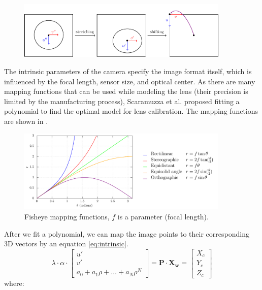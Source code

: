 \begin{figure}[H]
	\centering
	\includegraphics[width=0.9\textwidth]{./fig/tikz/ellipse.pdf}
	\caption{}
	\label{fig:ellipse}
  \end{figure}

The intrinsic parameters of the camera specify the image format itself, which is influenced by the focal length, sensor size, and optical center. As there are many mapping
functions that can be used while modeling the lens (their precision is limited by the manufacturing process), Scaramuzza et al. \cite{scaramuzzacalibration} proposed
fitting a polynomial to find the optimal model for lens calibration. The mapping functions are shown in .
\begin{figure}[H]
  \centering
  \includegraphics[width=0.9\textwidth]{./fig/tikz/mapping.pdf}
  \caption{Fisheye mapping functions, $f$ is a parameter (focal length).}
  \label{fig:mapping_functions}
\end{figure}

After we fit a polynomial, we can map the image points to their corresponding 3D vectors by an equation \ref{eq:intrinsic}.
\begin{equation}
	\lambda \cdot \alpha \cdot
	\begin{bmatrix}
		u' \\
		v' \\
		a_0 + a_1 \rho + \dots + a_{N} \rho^{N} 
	\end{bmatrix}
	= \mathbf{P} \cdot \mathbf{X_w} = %
	\begin{bmatrix}
		X_c \\
		Y_c \\
		Z_c
	\end{bmatrix}
	\label{eq:intrinsic}
\end{equation}
where:

